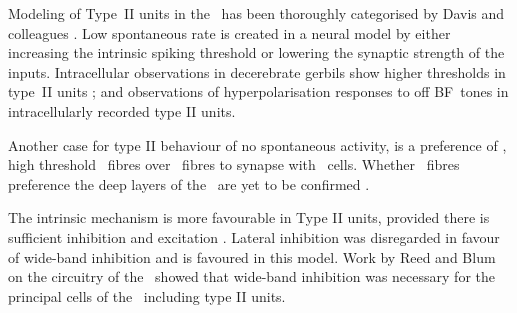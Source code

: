 Modeling of Type~II units in the \DCN~has been thoroughly categorised by Davis and colleagues \citep{YoungDavis:2002,HancockDavisEtAl:2001,DavisYoung:2000,SpirouDavisEtAl:1999,HancockDavisEtAl:1997,DavisVoigt:1996,DavisVoigt:1994,DavisVoigt:1991}.
Low spontaneous rate is created in a neural model by either increasing the intrinsic spiking threshold or lowering the synaptic strength of the inputs.
Intracellular observations in decerebrate gerbils show higher thresholds in type~II units \citep{DingVoigt:1997}; and observations of hyperpolarisation responses to off \gls{BF}~tones in intracellularly recorded type II units.

Another case for type II behaviour of no spontaneous activity, is a preference of \LSR, high threshold \AN~fibres over \HSR~fibres to synapse with \TV~cells.
Whether \LSR~fibres preference the deep layers of the \CN~are yet to be confirmed \citep{Ryugo:2008,MeltzerRyugo:2006,RyugoParks:2003,BabalianJacommeEtAl:2002}.




The intrinsic mechanism is more favourable in Type II units, provided there is sufficient inhibition and excitation \citep{HancockDavisEtAl:1997}.
Lateral inhibition was disregarded in favour of wide-band inhibition \citep{HancockDavisEtAl:1997} and is favoured in this model.
Work by Reed and Blum \citep{ReedBlum:1995,BlumReedEtAl:1995,ReedBlum:1997,BlumReed:1998} on the circuitry of the \DCN~showed that wide-band inhibition was necessary for the principal cells of the \DCN~including type II units.










